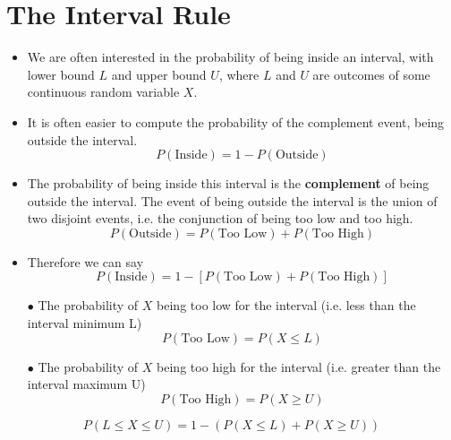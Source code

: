 \documentclass[a4paper,12pt]{article}
\begin{document}
\section*{The Interval Rule}


\begin{itemize}
\item We are often interested in the probability of being inside an interval, with lower bound $L$ and upper bound $U$, where $L$ and $U$ are outcomes of some continuous random variable $X$.
\item It is often easier to compute the probability of the complement event, being outside the interval.
\[ P( \mbox{Inside} ) = 1 - P( \mbox{Outside} )  \]
\item The probability of being inside this interval is the \textbf{complement} of being outside the interval. The event of being outside the interval is the union of two disjoint events, i.e. the conjunction of being too low and too high.
\[ P( \mbox{Outside} ) = P( \mbox{Too Low} ) +  P( \mbox{Too High} ) \]
\item Therefore we can say
\[ P( \mbox{Inside} ) = 1- [P( \mbox{Too Low} ) +  P( \mbox{Too High} )] \]

\end{itemize}

\begin{itemize}
\item[$\bullet$] The probability of $X$ being too low for the interval (i.e. less than the interval minimum L)
\[ P( \mbox{Too Low} ) = P(X \leq L) \]
\item[$\bullet$] The probability of $X$ being too high for the interval (i.e. greater than the interval maximum U)
\[ P( \mbox{Too High} ) =P(X \geq U ) \]
\end{itemize}



% 




\[ P(L \leq X \leq U) = 1 - ( P(X \leq L) +  P(X \geq U ) ) \]

% 
\end{document}
